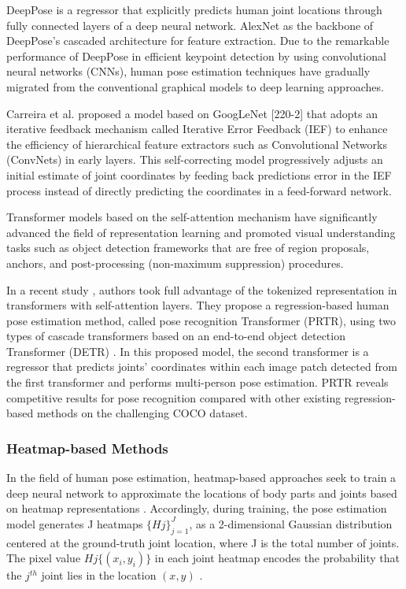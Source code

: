 DeepPose \cite{toshev_deeppose_2014} is a regressor that explicitly predicts human joint locations through fully connected layers of a deep neural network. AlexNet \cite{krizhevsky_imagenet_2012} as the backbone of DeepPose's cascaded architecture for feature extraction. Due to the remarkable performance of DeepPose in efficient keypoint detection by using convolutional neural networks (CNNs), human pose estimation techniques have gradually migrated from the conventional graphical models to deep learning approaches. 

Carreira et al. \cite{carreira_human_2016} proposed a model based on GoogLeNet [220-2] that adopts an iterative feedback mechanism called Iterative Error Feedback (IEF) to enhance the efficiency of hierarchical feature extractors such as Convolutional Networks (ConvNets) in early layers. This self-correcting model progressively adjusts an initial estimate of joint coordinates by feeding back predictions error in the IEF process instead of directly predicting the coordinates in a feed-forward network.

Transformer models \cite{vaswani_attention_2017} based on the self-attention mechanism have significantly advanced the field of representation learning and promoted visual understanding tasks such as object detection frameworks that are free of region proposals, anchors, and post-processing (non-maximum suppression) procedures. 

In a recent study \cite{li_pose_2021}, authors took full advantage of the tokenized representation in transformers with self-attention layers. They propose a regression-based human pose estimation method, called pose recognition Transformer (PRTR), using two types of cascade transformers based on an end-to-end object detection Transformer (DETR) \cite{carion_end--end_2020}. In this proposed model, the second transformer is a regressor that predicts joints' coordinates within each image patch detected from the first transformer and performs multi-person pose estimation. PRTR reveals competitive results for pose recognition compared with other existing regression-based methods on the challenging COCO dataset.


\subsubsection{Heatmap-based Methods}

In the field of human pose estimation, heatmap-based approaches seek to train a deep neural network to approximate the locations of body parts and joints based on heatmap representations \cite{chen_articulated_2014, newell_stacked_2016, wei_convolutional_2016}. Accordingly, during training, the pose estimation model generates J heatmaps $\{Hj\}_{j=1}^J$, as a 2-dimensional Gaussian distribution centered at the ground-truth joint location, where J is the total number of joints. The pixel value $Hj \{(x_i,y_i)\}$ in each joint heatmap encodes the probability that the $j^{th}$ joint lies in the location $(x,y)$  \cite{tompson_efficient_2015, tompson_joint_2014}. 


